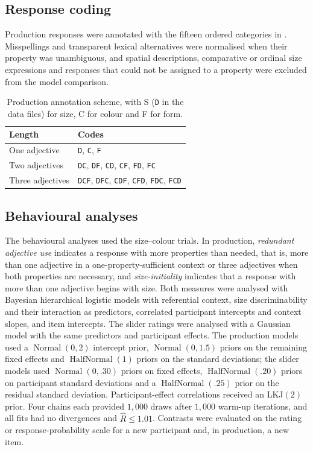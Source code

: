 \documentclass[10pt,a4paper,fleqn]{article}
\newcommand{\adj}[1]{\textsc{#1}}
\begin{document}
\subsection{Response coding}

Production responses were annotated with the fifteen ordered categories in .
Misspellings and transparent lexical alternatives were normalised when their property was unambiguous, and spatial descriptions, comparative or ordinal size expressions and responses that could not be assigned to a property were excluded from the model comparison.

\begin{table}[H]
\centering
\caption{Production annotation scheme, with \adj{S} (\texttt{D} in the data files) for size, \adj{C} for colour and \adj{F} for form.}
\label{tab:production-coding}
\footnotesize
\begin{tabularx}{0.7\textwidth}{p{2.6cm}X}
\toprule
Length & Codes \\
\midrule
One adjective & \texttt{D}, \texttt{C}, \texttt{F} \\
Two adjectives & \texttt{DC}, \texttt{DF}, \texttt{CD}, \texttt{CF}, \texttt{FD}, \texttt{FC} \\
Three adjectives & \texttt{DCF}, \texttt{DFC}, \texttt{CDF}, \texttt{CFD}, \texttt{FDC}, \texttt{FCD} \\
\bottomrule
\end{tabularx}
\end{table}

\subsection{Behavioural analyses}

The behavioural analyses used the size--colour trials.
In production, \emph{redundant adjective use} indicates a response with more properties than needed, that is, more than one adjective in a one-property-sufficient context or three adjectives when both properties are necessary, and \emph{size-initiality} indicates that a response with more than one adjective begins with size.
Both measures were analysed with Bayesian hierarchical logistic models with referential context, size discriminability and their interaction as predictors, correlated participant intercepts and context slopes, and item intercepts.
The slider ratings were analysed with a Gaussian model with the same predictors and participant effects.
The production models used a $\operatorname{Normal}(0,2)$ intercept prior, $\operatorname{Normal}(0,1.5)$ priors on the remaining fixed effects and $\operatorname{HalfNormal}(1)$ priors on the standard deviations; the slider models used $\operatorname{Normal}(0,.30)$ priors on fixed effects, $\operatorname{HalfNormal}(.20)$ priors on participant standard deviations and a $\operatorname{HalfNormal}(.25)$ prior on the residual standard deviation.
Participant-effect correlations received an LKJ$(2)$ prior.
Four chains each provided $1{,}000$ draws after $1{,}000$ warm-up iterations, and all fits had no divergences and $\widehat{R}\leq1.01$.
Contrasts were evaluated on the rating or response-probability scale for a new participant and, in production, a new item.
\end{document}
